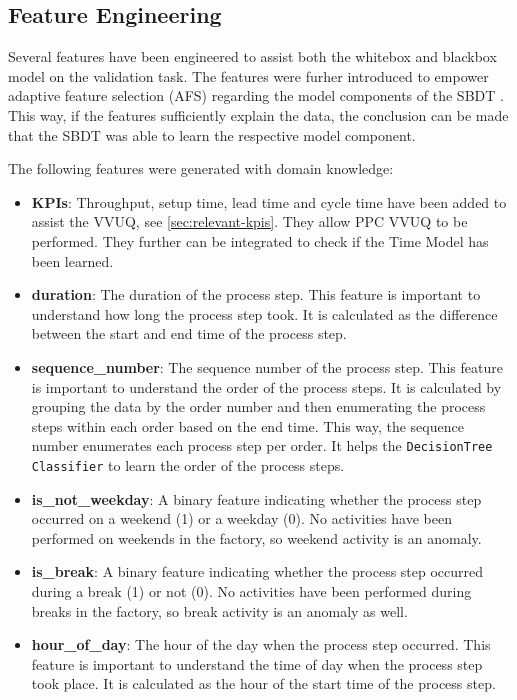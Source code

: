 \subsection*{Feature Engineering}
\label{sec:feature-engineering}

Several features have been engineered to assist both the whitebox and blackbox model on the validation task. The features were furher introduced to empower adaptive feature selection (AFS) regarding the model components of the SBDT \autocite{schwede2024learning}. This way, if the features sufficiently explain the data, the conclusion can be made that the SBDT was able to learn the respective model component.

The following features were generated with domain knowledge:

\begin{itemize}
  \item \textbf{KPIs}: Throughput, setup time, lead time and cycle time have been added to assist the VVUQ, see \autoref{sec:relevant-kpis}. They allow PPC VVUQ to be performed. They further can be integrated to check if the Time Model has been learned.
  \item \textbf{duration}: The duration of the process step. This feature is important to understand how long the process step took. It is calculated as the difference between the start and end time of the process step.
  \item \textbf{sequence\_number}: The sequence number of the process step. This feature is important to understand the order of the process steps. It is calculated by grouping the data by the order number and then enumerating the process steps within each order based on the end time. This way, the sequence number enumerates each process step per order. It helps the \texttt{DecisionTree Classifier} to learn the order of the process steps.
  \item \textbf{is\_not\_weekday}: A binary feature indicating whether the process step occurred on a weekend (1) or a weekday (0). No activities have been performed on weekends in the factory, so weekend activity is an anomaly.
  \item \textbf{is\_break}: A binary feature indicating whether the process step occurred during a break (1) or not (0). No activities have been performed during breaks in the factory, so break activity is an anomaly as well.
  \item \textbf{hour\_of\_day}: The hour of the day when the process step occurred. This feature is important to understand the time of day when the process step took place. It is calculated as the hour of the start time of the process step.

\end{itemize}
